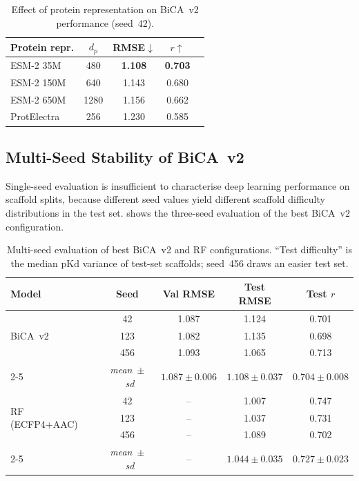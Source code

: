 \documentclass[11pt,twocolumn]{article}
\begin{document}
\begin{table}[htbp]
\centering
\caption{Effect of protein representation on BiCA~v2 performance (seed~42).}
\label{tab:protein_ablation}
\small
\begin{tabular}{lcccc}
\toprule
Protein repr. & $d_p$ & RMSE$\downarrow$ & $r$$\uparrow$ \\
\midrule
ESM-2 35M  & 480  & \textbf{1.108} & \textbf{0.703} \\
ESM-2 150M & 640  & 1.143          & 0.680          \\
ESM-2 650M & 1280 & 1.156          & 0.662          \\
ProtElectra & 256 & 1.230          & 0.585          \\
\bottomrule
\end{tabular}
\end{table}

\subsection{Multi-Seed Stability of BiCA~v2}

Single-seed evaluation is insufficient to characterise deep learning
performance on scaffold splits, because different seed values yield different
scaffold difficulty distributions in the test set.  
shows the three-seed evaluation of the best BiCA~v2 configuration.

\begin{table}[htbp]
\centering
\caption{Multi-seed evaluation of best BiCA~v2 and RF configurations.
  ``Test difficulty'' is the median pKd variance of test-set scaffolds;
  seed~456 draws an easier test set.}
\label{tab:multiseed}
\small
\begin{tabular}{lcccc}
\toprule
Model & Seed & Val RMSE & Test RMSE & Test $r$ \\
\midrule
\multirow{3}{*}{BiCA~v2} & 42  & 1.087 & 1.124 & 0.701 \\
                          & 123 & 1.082 & 1.135 & 0.698 \\
                          & 456 & 1.093 & 1.065 & 0.713 \\
\cmidrule{2-5}
& \textit{mean~$\pm$~sd} & $1.087\pm0.006$ & $1.108\pm0.037$ & $0.704\pm0.008$ \\
\midrule
\multirow{3}{*}{RF (ECFP4+AAC)} & 42  & -- & 1.007 & 0.747 \\
                                  & 123 & -- & 1.037 & 0.731 \\
                                  & 456 & -- & 1.089 & 0.702 \\
\cmidrule{2-5}
& \textit{mean~$\pm$~sd} & -- & $1.044\pm0.035$ & $0.727\pm0.023$ \\
\bottomrule
\end{tabular}
\end{table}
\end{document}
